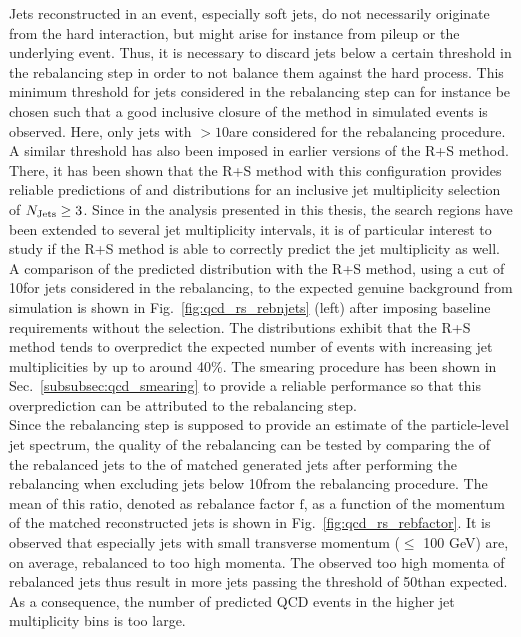 Jets reconstructed in an event, especially soft jets, do not necessarily originate from the hard interaction, but might arise for instance from pileup or the underlying event. Thus, it is necessary to discard jets below a certain \pt threshold in the rebalancing step in order to not balance them against the hard process. This minimum \pt threshold for jets considered in the rebalancing step can for instance be chosen such that a good inclusive closure of the method in simulated events is observed. Here, only jets with \pt$> 10$\gev are considered for the rebalancing procedure. A similar \pt threshold has also been imposed in earlier versions of the R+S method. There, it has been shown that the R+S method with this configuration provides reliable predictions of \HT and \MHT distributions for an inclusive jet multiplicity selection of $N_{\text{Jets}} \ge 3$. Since in the analysis presented in this thesis, the search regions have been extended to several jet multiplicity intervals, it is of particular interest to study if the R+S method is able to correctly predict the jet multiplicity as well. \\ 
A comparison of the predicted \NJets distribution with the R+S method, using a \pt cut of 10\gev for jets considered in the rebalancing, to the expected genuine background from simulation is shown in Fig.~\ref{fig:qcd_rs_rebnjets} (left) after imposing baseline requirements without the \MHT selection. The distributions exhibit that the R+S method tends to overpredict the expected number of events with increasing jet multiplicities by up to around 40\%. The smearing procedure has been shown in Sec.~\ref{subsubsec:qcd_smearing} to provide a reliable performance so that this overprediction can be attributed to the rebalancing step. \\
Since the rebalancing step is supposed to provide an estimate of the particle-level jet spectrum, the quality of the rebalancing can be tested by comparing the \pt of the rebalanced jets to the \pt of matched generated jets after performing the rebalancing when excluding jets below 10\gev from the rebalancing procedure. The mean of this ratio, denoted as rebalance factor $\mathrm{f}$, as a function of the momentum of the matched reconstructed jets is shown in Fig.~\ref{fig:qcd_rs_rebfactor}. It is observed that especially jets with small transverse momentum (\pt $\leq$ 100 GeV) are, on average, rebalanced to too high momenta. The observed too high momenta of rebalanced jets thus result in more jets passing the \NJets threshold of 50\gev than expected. As a consequence, the number of predicted QCD events in the higher jet multiplicity bins is too large. 
